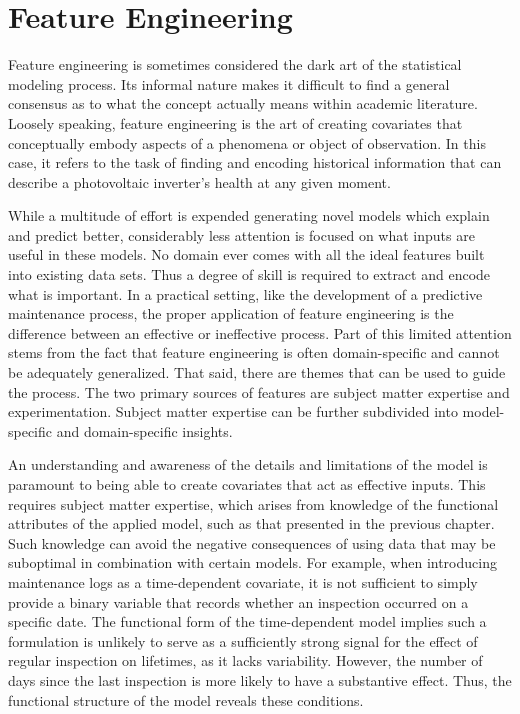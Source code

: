 \section*{Feature Engineering}

Feature engineering is sometimes considered the dark art of the statistical modeling process. Its informal nature makes it difficult to find a general consensus as to what the concept actually means within academic literature\cite{Zabokrtsky2015}. Loosely speaking, feature engineering is the art of creating covariates that conceptually embody aspects of a phenomena or object of observation. In this case, it refers to the task of finding and encoding historical information that can describe a photovoltaic inverter's health at any given moment. 

While a multitude of effort is expended generating novel  models which explain and predict better, considerably less attention is focused on what inputs are useful in these models. No domain ever comes with all the ideal features built into existing data sets. Thus a degree of skill is required to extract and encode what is important. In a practical setting, like the development of a predictive maintenance process, the proper application of feature engineering is the difference between an effective or ineffective process\cite{Yu2010a}. Part of this limited attention stems from the fact that feature engineering is often domain-specific and cannot be adequately generalized. That said, there are themes that can be used to guide the process. The two primary sources of features are subject matter expertise and experimentation. Subject matter expertise can be further subdivided into model-specific and domain-specific insights.

An understanding and awareness of the details and limitations of the model is paramount to being able to create covariates that act as effective inputs. This requires subject matter expertise, which arises from knowledge of the functional attributes of the applied model, such as that presented in the previous chapter. Such knowledge can avoid the negative consequences of using data that may be suboptimal in combination with certain models. For example, when introducing maintenance logs as a time-dependent covariate, it is not sufficient to simply provide a binary variable that records whether an inspection occurred on a specific date. The functional form of the time-dependent model implies such a formulation is unlikely to serve as a sufficiently strong signal for the effect of regular inspection on lifetimes, as it lacks variability. However, the number of days since the last inspection is more likely to have a substantive effect. Thus, the functional structure of the model reveals these conditions.

